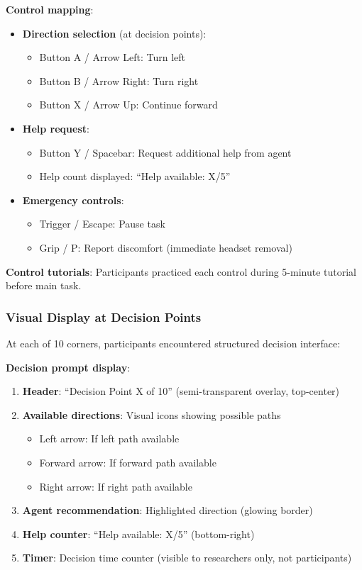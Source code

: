 \documentclass[12pt]{article}
\begin{document}
\textbf{Control mapping}:
\begin{itemize}
    \item \textbf{Direction selection} (at decision points):
    \begin{itemize}
        \item Button A / Arrow Left: Turn left
        \item Button B / Arrow Right: Turn right
        \item Button X / Arrow Up: Continue forward
    \end{itemize}
    
    \item \textbf{Help request}:
    \begin{itemize}
        \item Button Y / Spacebar: Request additional help from agent
        \item Help count displayed: ``Help available: X/5''
    \end{itemize}
    
    \item \textbf{Emergency controls}:
    \begin{itemize}
        \item Trigger / Escape: Pause task
        \item Grip / P: Report discomfort (immediate headset removal)
    \end{itemize}
\end{itemize}

\textbf{Control tutorials}: Participants practiced each control during 5-minute tutorial before main task.

\subsubsection{Visual Display at Decision Points}

At each of 10 corners, participants encountered structured decision interface:

\textbf{Decision prompt display}:
\begin{enumerate}
    \item \textbf{Header}: ``Decision Point X of 10'' (semi-transparent overlay, top-center)
    \item \textbf{Available directions}: Visual icons showing possible paths
    \begin{itemize}
        \item Left arrow: If left path available
        \item Forward arrow: If forward path available
        \item Right arrow: If right path available
    \end{itemize}
    \item \textbf{Agent recommendation}: Highlighted direction (glowing border)
    \item \textbf{Help counter}: ``Help available: X/5'' (bottom-right)
    \item \textbf{Timer}: Decision time counter (visible to researchers only, not participants)
\end{enumerate}
\end{document}
